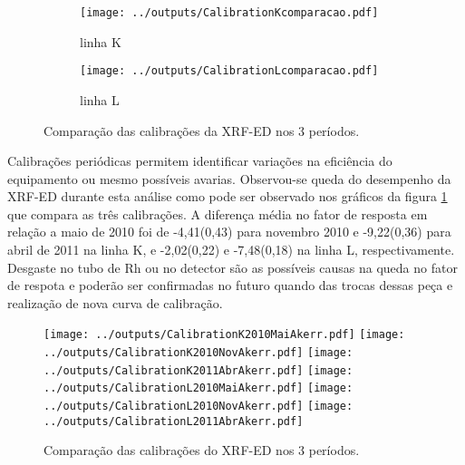 \begin{figure}[H]
  \begin{subfigure}[b]{0.5\textwidth}
    \texttt{[image: ../outputs/CalibrationKcomparacao.pdf]}
    \caption{linha K}
  \end{subfigure}%
  \begin{subfigure}[b]{0.5\textwidth}
    \texttt{[image: ../outputs/CalibrationLcomparacao.pdf]}
    \caption{linha L}
  \end{subfigure}
  \caption{Comparação das calibrações da XRF-ED nos 3 períodos. 
          \label{fig:compara_calibracao}}
\end{figure}

Calibrações periódicas permitem identificar variações na eficiência 
do equipamento ou mesmo possíveis avarias. Observou-se queda do desempenho da 
XRF-ED durante esta análise como pode ser observado nos gráficos da figura 
\ref{fig:compara_calibracao} que compara as três calibrações. 
A diferença média no fator de resposta em relação a maio de 2010 foi de 
-4,41(0,43) para novembro 2010 e -9,22(0,36) para abril de 2011 na linha K, 
e -2,02(0,22) e -7,48(0,18) na linha L, respectivamente. Desgaste no tubo 
de Rh ou no detector são as possíveis causas na queda no fator de respota 
e poderão ser confirmadas no futuro quando das trocas dessas peça e realização
de nova curva de calibração.

\begin{landscape}
\begin{figure}
    \centering
    \texttt{[image: ../outputs/CalibrationK2010MaiAkerr.pdf]}
    \texttt{[image: ../outputs/CalibrationK2010NovAkerr.pdf]}
    \texttt{[image: ../outputs/CalibrationK2011AbrAkerr.pdf]}
    \texttt{[image: ../outputs/CalibrationL2010MaiAkerr.pdf]}
    \texttt{[image: ../outputs/CalibrationL2010NovAkerr.pdf]}
    \texttt{[image: ../outputs/CalibrationL2011AbrAkerr.pdf]}
    \caption{Comparação das calibrações do XRF-ED nos 3 períodos. 
            \label{fig:edx_calib3}}
\end{figure}
\end{landscape}

\begin{landscape}
  
\end{landscape}

\begin{landscape}
  
\end{landscape}

